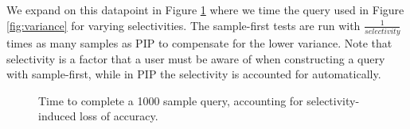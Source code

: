 We expand on this datapoint in Figure \ref{fig:scaling_selectivity} where we time the query used in Figure \ref{fig:variance} for varying selectivities.  The sample-first tests are run with $\frac{1}{selectivity}$ times as many samples as PIP to compensate for the lower variance.  Note that selectivity is a factor that a user must be aware of when constructing a query with sample-first, while in PIP the selectivity is accounted for automatically.

\begin{figure}
\begin{center}
\caption{Time to complete a 1000 sample query, accounting for selectivity-induced loss of accuracy.}
\label{fig:scaling_selectivity}
\end{center}
\end{figure}

%
%

